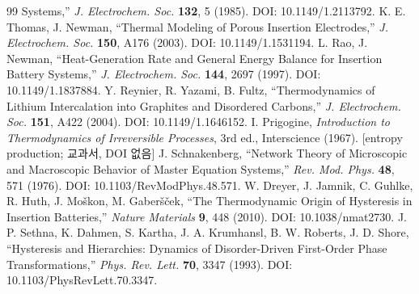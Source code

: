 \documentclass[11pt,a4paper]{article}
\newcommand{\brk}{\discretionary{}{}{}}%
\begin{document}
\begin{thebibliography}{99}
  Systems,'' \emph{J. Electrochem. Soc.} \textbf{132}, 5 (1985). DOI: 10.1149/\brk 1.2113792.
 K. E. Thomas, J. Newman, ``Thermal Modeling of Porous Insertion Electrodes,''
  \emph{J. Electrochem. Soc.} \textbf{150}, A176 (2003). DOI: 10.1149/\brk 1.1531194.
 L. Rao, J. Newman, ``Heat-Generation Rate and General Energy Balance for Insertion
  Battery Systems,'' \emph{J. Electrochem. Soc.} \textbf{144}, 2697 (1997). DOI: 10.1149/1.1837884.
 Y. Reynier, R. Yazami, B. Fultz, ``Thermodynamics of Lithium Intercalation into
  Graphites and Disordered Carbons,'' \emph{J. Electrochem. Soc.} \textbf{151}, A422 (2004).
  DOI: 10.1149/1.1646152.
 I. Prigogine, \emph{Introduction to Thermodynamics of Irreversible Processes},
  3rd ed., Interscience (1967). [entropy production; 교과서, DOI 없음]
 J. Schnakenberg, ``Network Theory of Microscopic and Macroscopic Behavior of
  Master Equation Systems,'' \emph{Rev. Mod. Phys.} \textbf{48}, 571 (1976). DOI: 10.1103/\brk RevModPhys.48.571.
 W. Dreyer, J. Jamnik, C. Guhlke, R. Huth, J. Mo\v{s}kon, M. Gaber\v{s}\v{c}ek,
  ``The Thermodynamic Origin of Hysteresis in Insertion Batteries,'' \emph{Nature Materials} \textbf{9},
  448 (2010). DOI: 10.1038/\brk nmat2730.
 J. P. Sethna, K. Dahmen, S. Kartha, J. A. Krumhansl, B. W. Roberts, J. D. Shore,
  ``Hysteresis and Hierarchies: Dynamics of Disorder-Driven First-Order Phase Transformations,''
  \emph{Phys. Rev. Lett.} \textbf{70}, 3347 (1993). DOI: 10.1103/\brk PhysRevLett.70.3347.
\end{thebibliography}
\end{document}
